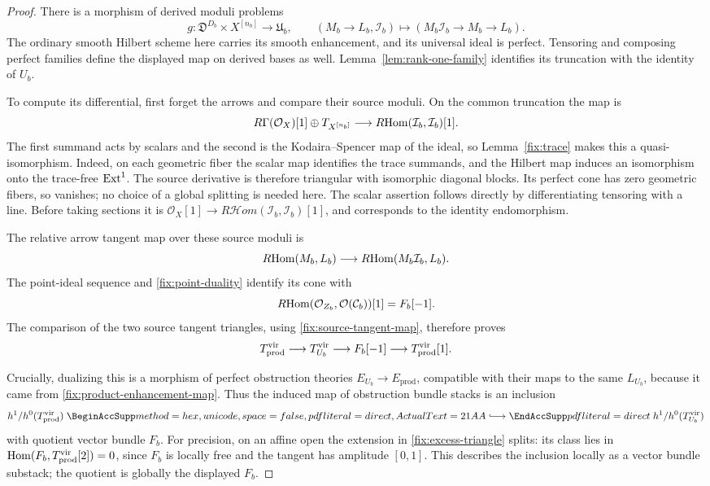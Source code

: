 \begin{proof}
There is a morphism of derived moduli problems
\begin{equation}\label{fix:product-enhancement-map}
 g:\mathfrak D^{D_b}\times X^{[n_b]}\longrightarrow\mathfrak U_b,
 \qquad
 (M_b\to L_b,\mathcal I_b)\longmapsto
       (M_b\mathcal I_b\to M_b\to L_b).
\end{equation}
The ordinary smooth Hilbert scheme here carries its smooth
enhancement, and its universal ideal is perfect.
Tensoring and composing perfect families define the displayed
map on derived bases as well.  Lemma~\ref{lem:rank-one-family}
identifies its truncation with the identity of \(U_b\).

To compute its differential, first forget the arrows and
compare their source moduli.  On the common truncation the map is
\begin{equation}\label{fix:source-tangent-map}
 R\Gamma(\mathcal O_X)[1]\oplus T_{X^{[n_b]}}
       \longrightarrow
       R\!\operatorname{Hom}(\mathcal I_b,\mathcal I_b)[1].
\end{equation}
The first summand acts by scalars and the second is the
Kodaira--Spencer map of the ideal, so
Lemma~\ref{fix:trace} makes this a quasi-isomorphism.
Indeed, on each geometric fiber the scalar map identifies the trace
summands, and the Hilbert map induces an isomorphism onto the
trace-free \(\operatorname{Ext}^1\).  The source derivative is therefore triangular
with isomorphic diagonal blocks.  Its perfect cone has zero geometric
fibers, so vanishes; no choice of a global splitting is needed here.
The scalar assertion follows directly by differentiating
tensoring with a line.  Before taking sections it is
\(\mathcal O_X[1]\to
R\mathcal{H}om(\mathcal I_b,\mathcal I_b)[1]\),
and corresponds to the identity endomorphism.

The relative arrow tangent map over these source moduli is
\[
 R\!\operatorname{Hom}(M_b,L_b)\longrightarrow
       R\!\operatorname{Hom}(M_b\mathcal I_b,L_b).
\]
The point-ideal sequence and
\eqref{fix:point-duality} identify its cone with
\[
 R\!\operatorname{Hom}(\mathcal O_{Z_b},\mathcal O(\mathcal C_b))[1]
       =F_b[-1].
\]
The comparison of the two source tangent triangles, using
\eqref{fix:source-tangent-map}, therefore proves
\begin{equation}\label{fix:excess-triangle}
 T_{\mathrm{prod}}^{\mathrm{vir}}\longrightarrow T_{U_b}^{\mathrm{vir}}
       \longrightarrow F_b[-1]
       \longrightarrow T_{\mathrm{prod}}^{\mathrm{vir}}[1].
\end{equation}

Crucially, dualizing this is a morphism of perfect obstruction
theories \(E_{U_b}\to E_{\mathrm{prod}}\), compatible with
their maps to the same \(L_{U_b}\), because it came from
\eqref{fix:product-enhancement-map}.  Thus the induced map
of obstruction bundle stacks is an inclusion
\[
 h^1/h^0(T_{\mathrm{prod}}^\vir)
       \longhookrightarrowactual
 h^1/h^0(T_{U_b}^\vir)
\]
with quotient vector bundle \(F_b\).  For precision, on an
affine open the extension in \eqref{fix:excess-triangle}
splits: its class lies in
\(\operatorname{Hom}(F_b,T_{\mathrm{prod}}^{\mathrm{vir}}[2])=0\), since \(F_b\)
is locally free and the tangent has amplitude \([0,1]\).
This describes the inclusion locally as a vector bundle
substack; the quotient is globally the displayed \(F_b\).


\end{proof}
